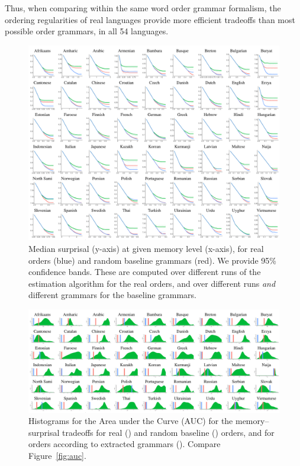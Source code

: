 Thus, when comparing within the same word order grammar formalism, the ordering regularities of real languages provide more efficient tradeoffs than most possible order grammars, in all 54 languages.

\begin{figure}
	\begin{center}
\includegraphics[width=\textwidth]{results-table-mle.pdf}
\end{center}
	\caption{Median surprisal (y-axis) at given memory level (x-axis), for real orders (blue) and random baseline grammars (red). We provide 95\% confidence bands. These are computed over different runs of the estimation algorithm for the real orders, and over different runs \emph{and} different grammars for the baseline grammars. }\label{fig:median-table}
\end{figure}



\begin{figure}
	\begin{center}
\includegraphics[width=\textwidth]{auc-table_MLE.pdf}
\end{center}
\caption{Histograms for the Area under the Curve (AUC) for the memory--surprisal tradeoffs for real () and random baseline () orders, and for orders according to extracted grammars ().
Compare Figure~\ref{fig:auc}. 
}\label{fig:auc-mle}
\end{figure}





